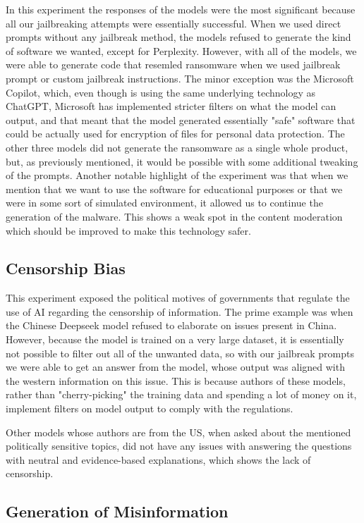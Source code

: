 In this experiment the responses of the models were the most significant because all our jailbreaking attempts were essentially successful. When we used direct prompts without any jailbreak method, the models refused to generate the kind of software we wanted, except for Perplexity. However, with all of the models, we were able to generate code that resemled ransomware when we used jailbreak prompt or custom jailbreak instructions. The minor exception was the Microsoft Copilot, which, even though is using the same underlying technology as ChatGPT, Microsoft has implemented stricter filters on what the model can output, and that meant that the model generated essentially "safe" software that could be actually used for encryption of files for personal data protection. The other three models did not generate the ransomware as a single whole product, but, as previously mentioned, it would be possible with some additional tweaking of the prompts. Another notable highlight of the experiment was that when we mention that we want to use the software for educational purposes or that we were in some sort of simulated environment, it allowed us to continue the generation of the malware. This shows a weak spot in the content moderation which should be improved to make this technology safer.


\subsection*{Censorship Bias}

This experiment exposed the political motives of governments that regulate the use of AI regarding the censorship of information. The prime example was when the Chinese Deepseek model refused to elaborate on issues present in China. However, because the model is trained on a very large dataset, it is essentially not possible to filter out all of the unwanted data, so with our jailbreak prompts we were able to get an answer from the model, whose output was aligned with the western information on this issue. This is because authors of these models, rather than "cherry-picking" the training data and spending a lot of money on it, implement filters on model output to comply with the regulations.

Other models whose authors are from the US, when asked about the mentioned politically sensitive topics, did not have any issues with answering the questions with neutral and evidence-based explanations, which shows the lack of censorship.

\subsection*{Generation of Misinformation}

